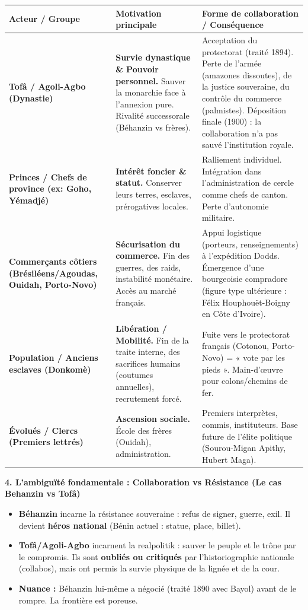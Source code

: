 \documentclass[11pt]{article}
\newcommand{\cle}[1]{{\popxbold\color{popdark}#1}}
\begin{document}
\begin{exoresolu}
\begin{center}
\begin{tabularx}{\linewidth}{|l|X|X|}
\hline
\rowcolor{popblueL}
\textbf{Acteur / Groupe} & \textbf{Motivation principale} & \textbf{Forme de collaboration / Conséquence} \\
\hline
\textbf{Tofâ / Agoli-Agbo (Dynastie)} & \textbf{Survie dynastique \& Pouvoir personnel.} Sauver la monarchie face à l'annexion pure. Rivalité successorale (Béhanzin vs frères). & Acceptation du \cle{protectorat} (traité 1894). Perte de l'armée (amazones dissoutes), de la justice souveraine, du contrôle du commerce (palmistes). Déposition finale (1900) : la collaboration n'a pas sauvé l'institution royale. \\
\hline
\textbf{Princes / Chefs de province (ex: Goho, Yémadjé)} & \textbf{Intérêt foncier \& statut.} Conserver leurs terres, esclaves, prérogatives locales. & Ralliement individuel. Intégration dans l'administration de \cle{cercle} comme chefs de canton. Perte d'autonomie militaire. \\
\hline
\textbf{Commerçants côtiers (Brésiléens/Agoudas, Ouidah, Porto-Novo)} & \textbf{Sécurisation du commerce.} Fin des guerres, des raids, instabilité monétaire. Accès au marché français. & Appui logistique (porteurs, renseignements) à l'expédition Dodds. Émergence d'une bourgeoisie compradore (figure type ultérieure : \cle{Félix Houphouët-Boigny} en Côte d'Ivoire). \\
\hline
\textbf{Population / Anciens esclaves (Donkomè)} & \textbf{Libération / Mobilité.} Fin de la traite interne, des sacrifices humains (coutumes annuelles), recrutement forcé. & Fuite vers le protectorat français (Cotonou, Porto-Novo) = \cle{« vote par les pieds »}. Main-d'œuvre pour colons/chemins de fer. \\
\hline
\textbf{Évolués / Clercs (Premiers lettrés)} & \textbf{Ascension sociale.} École des frères (Ouidah), administration. & Premiers interprètes, commis, instituteurs. Base future de l'élite politique (Sourou-Migan Apithy, Hubert Maga). \\
\hline
\end{tabularx}
\end{center}

\textbf{4. L'ambiguïté fondamentale : Collaboration vs Résistance (Le cas Behanzin vs Tofâ)}
\begin{itemize}
    \item \textbf{Béhanzin} incarne la \cle{résistance souveraine} : refus de signer, guerre, exil. Il devient \textbf{héros national} (Bénin actuel : statue, place, billet).
    \item \textbf{Tofâ/Agoli-Agbo} incarnent la \cle{realpolitik} : sauver le peuple et le trône par le compromis. Ils sont \textbf{oubliés ou critiqués} par l'historiographie nationale (collabos), mais ont permis la survie physique de la lignée et de la cour.
    \item \textbf{Nuance :} Béhanzin lui-même a négocié (traité 1890 avec Bayol) avant de le rompre. La frontière est poreuse.
\end{itemize}


\end{exoresolu}
\end{document}
